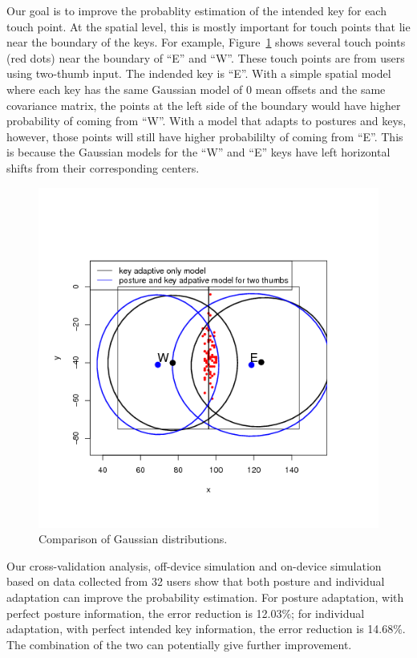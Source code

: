 \documentclass{sigchi}
\begin{document}
Our goal is to improve the probablity estimation of the intended key for each touch point.
At the spatial level, this is mostly important for touch points that lie near the 
boundary of the keys. For example, Figure~\ref{fig:e-w-ellipses-1} shows several touch points (red dots)
near the boundary of ``E'' and ``W''. These touch points are from users using two-thumb input.
The indended key is ``E''. With a simple spatial
model where each key has the same Gaussian model of 0 mean offsets and the same 
covariance matrix, the points
at the left side of the boundary would have higher probability of coming from ``W''.
With a model that adapts to postures and keys, however, those points will still have higher
probabililty of coming from ``E''. This is because the Gaussian models for the ``W'' and ``E'' keys have left
horizontal shifts from their corresponding centers. 

\begin{figure}[tb]
 \includegraphics[width=1\columnwidth]{figures/key-posture-ellipse.png}
  \caption{Comparison of Gaussian distributions.}
  \label{fig:e-w-ellipses-1}
\end{figure}

Our cross-validation analysis, off-device simulation and on-device simulation based
on data collected from 32 users show
that both posture and individual adaptation can improve the probability estimation. For posture 
adaptation, with perfect posture information, the error reduction is 12.03\%; for individual adaptation, with perfect
intended key information, the error reduction is 14.68\%. The combination of the two 
can potentially give further improvement. 
\end{document}
